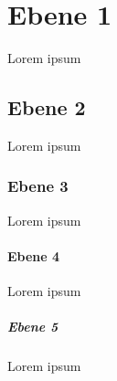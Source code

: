 \section{Ebene 1}
Lorem ipsum %
\subsection{Ebene 2}
Lorem ipsum %
\subsubsection{Ebene 3}
Lorem ipsum %
\paragraph{Ebene 4}
Lorem ipsum %
\subparagraph{Ebene 5}
Lorem ipsum %
